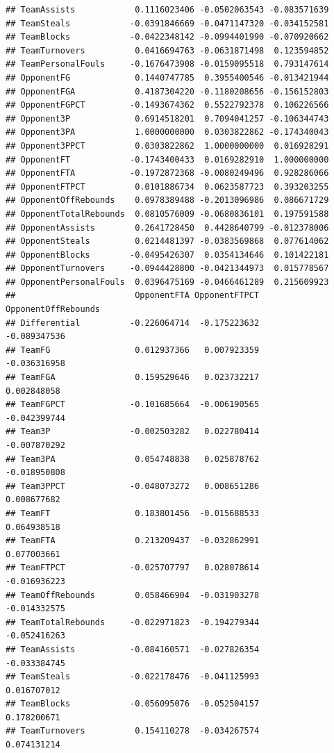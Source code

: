 \documentclass[]{book}
\begin{document}
\begin{verbatim}
## TeamAssists            0.1116023406 -0.0502063543 -0.083571639
## TeamSteals            -0.0391846669 -0.0471147320 -0.034152581
## TeamBlocks            -0.0422348142 -0.0994401990 -0.070920662
## TeamTurnovers          0.0416694763 -0.0631871498  0.123594852
## TeamPersonalFouls     -0.1676473908 -0.0159095518  0.793147614
## OpponentFG             0.1440747785  0.3955400546 -0.013421944
## OpponentFGA            0.4187304220 -0.1180208656 -0.156152803
## OpponentFGPCT         -0.1493674362  0.5522792378  0.106226566
## Opponent3P             0.6914518201  0.7094041257 -0.106344743
## Opponent3PA            1.0000000000  0.0303822862 -0.174340043
## Opponent3PPCT          0.0303822862  1.0000000000  0.016928291
## OpponentFT            -0.1743400433  0.0169282910  1.000000000
## OpponentFTA           -0.1972872368 -0.0080249496  0.928286066
## OpponentFTPCT          0.0101886734  0.0623587723  0.393203255
## OpponentOffRebounds    0.0978389488 -0.2013096986  0.086671729
## OpponentTotalRebounds  0.0810576009 -0.0680836101  0.197591588
## OpponentAssists        0.2641728450  0.4428640799 -0.012378006
## OpponentSteals         0.0214481397 -0.0383569868  0.077614062
## OpponentBlocks        -0.0495426307  0.0354134646  0.101422181
## OpponentTurnovers     -0.0944428800 -0.0421344973  0.015778567
## OpponentPersonalFouls  0.0396475169 -0.0466461289  0.215609923
##                        OpponentFTA OpponentFTPCT OpponentOffRebounds
## Differential          -0.226064714  -0.175223632        -0.089347536
## TeamFG                 0.012937366   0.007923359        -0.036316958
## TeamFGA                0.159529646   0.023732217         0.002848058
## TeamFGPCT             -0.101685664  -0.006190565        -0.042399744
## Team3P                -0.002503282   0.022780414        -0.007870292
## Team3PA                0.054748838   0.025878762        -0.018950808
## Team3PPCT             -0.048073272   0.008651286         0.008677682
## TeamFT                 0.183801456  -0.015688533         0.064938518
## TeamFTA                0.213209437  -0.032862991         0.077003661
## TeamFTPCT             -0.025707797   0.028078614        -0.016936223
## TeamOffRebounds        0.058466904  -0.031903278        -0.014332575
## TeamTotalRebounds     -0.022971823  -0.194279344        -0.052416263
## TeamAssists           -0.084160571  -0.027826354        -0.033384745
## TeamSteals            -0.022178476  -0.041125993         0.016707012
## TeamBlocks            -0.056095076  -0.052504157         0.178200671
## TeamTurnovers          0.154110278  -0.034267574         0.074131214

\end{verbatim}
\end{document}
